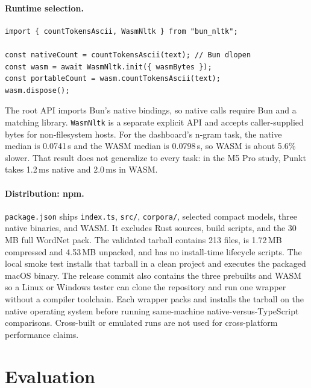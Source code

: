\documentclass[pdflatex,sn-mathphys-num]{sn-jnl}
\theoremstyle{thmstyleone}
\begin{document}
\paragraph{Runtime selection.}
\begin{lstlisting}[caption={Explicit native and WASM entry points (simplified).},label={lst:binding}]
import { countTokensAscii, WasmNltk } from "bun_nltk";

const nativeCount = countTokensAscii(text); // Bun dlopen
const wasm = await WasmNltk.init({ wasmBytes });
const portableCount = wasm.countTokensAscii(text);
wasm.dispose();
\end{lstlisting}
The root API imports Bun's native bindings, so native calls require Bun and a matching library. \texttt{WasmNltk} is a separate explicit API and accepts caller-supplied bytes for non-filesystem hosts. For the dashboard's n-gram task, the native median is 0.0741\,s and the WASM median is 0.0798\,s, so WASM is about 5.6\% slower. That result does not generalize to every task: in the M5 Pro study, Punkt takes 1.2\,ms native and 2.0\,ms in WASM.

\paragraph{Distribution: npm.}
\texttt{package.json} ships \texttt{index.ts}, \texttt{src/}, \texttt{corpora/}, selected compact models, three native binaries, and WASM. It excludes Rust sources, build scripts, and the 30\,MB full WordNet pack. The validated tarball contains 213 files, is 1.72\,MB compressed and 4.53\,MB unpacked, and has no install-time lifecycle scripts. The local smoke test installs that tarball in a clean project and executes the packaged macOS binary. The release commit also contains the three prebuilts and WASM so a Linux or Windows tester can clone the repository and run one wrapper without a compiler toolchain. Each wrapper packs and installs the tarball on the native operating system before running same-machine native-versus-TypeScript comparisons. Cross-built or emulated runs are not used for cross-platform performance claims.

\section{Evaluation}\label{sec:evaluation}
\end{document}
